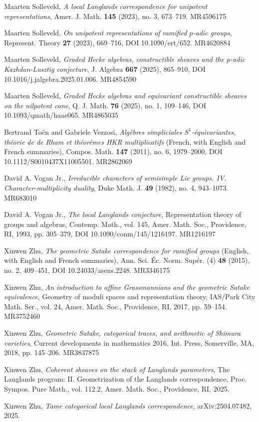 \begin{refs}
\item[{[Sol18]}] Maarten Solleveld, \emph{A local Langlands correspondence for unipotent representations}, Amer. J. Math. \textbf{145} (2023), no. 3, 673--719. MR4596175
\item[{[Sol19]}] Maarten Solleveld, \emph{On unipotent representations of ramified $p$-adic groups}, Represent. Theory \textbf{27} (2023), 669--716, DOI 10.1090/ert/652. MR4620884
\item[{[Sol22a]}] Maarten Solleveld, \emph{Graded Hecke algebras, constructible sheaves and the $p$-adic Kazhdan-Lusztig conjecture}, J. Algebra \textbf{667} (2025), 865--910, DOI 10.1016/j.jalgebra.2025.01.006. MR4854590
\item[{[Sol22b]}] Maarten Solleveld, \emph{Graded Hecke algebras and equivariant constructible sheaves on the nilpotent cone}, Q. J. Math. \textbf{76} (2025), no. 1, 109--146, DOI 10.1093/qmath/haae065. MR4865035
\item[{[TV]}] Bertrand To\"en and Gabriele Vezzosi, \emph{Alg\`ebres simpliciales $S^1$-\'equivariantes, th\'eorie de de Rham et th\'eor\`emes HKR multiplicatifs} (French, with English and French summaries), Compos. Math. \textbf{147} (2011), no. 6, 1979--2000, DOI 10.1112/S0010437X11005501. MR2862069
\item[{[Vo82]}] David A. Vogan Jr., \emph{Irreducible characters of semisimple Lie groups. IV. Character-multiplicity duality}, Duke Math. J. \textbf{49} (1982), no. 4, 943--1073. MR683010
\item[{[Vo93]}] David A. Vogan Jr., \emph{The local Langlands conjecture}, Representation theory of groups and algebras, Contemp. Math., vol. 145, Amer. Math. Soc., Providence, RI, 1993, pp. 305--379, DOI 10.1090/conm/145/1216197. MR1216197
\item[{[Zh15]}] Xinwen Zhu, \emph{The geometric Satake correspondence for ramified groups} (English, with English and French summaries), Ann. Sci. \'Ec. Norm. Sup\'er. (4) \textbf{48} (2015), no. 2, 409--451, DOI 10.24033/asens.2248. MR3346175
\item[{[Zh17]}] Xinwen Zhu, \emph{An introduction to affine Grassmannians and the geometric Satake equivalence}, Geometry of moduli spaces and representation theory, IAS/Park City Math. Ser., vol. 24, Amer. Math. Soc., Providence, RI, 2017, pp. 59--154. MR3752460
\item[{[Zh18]}] Xinwen Zhu, \emph{Geometric Satake, categorical traces, and arithmetic of Shimura varieties}, Current developments in mathematics 2016, Int. Press, Somerville, MA, 2018, pp. 145--206. MR3837875


\item[{[Zhu25a]}] Xinwen Zhu, \emph{Coherent sheaves on the stack of Langlands parameters}, The Langlands program: II. Geometrization of the Langlands correspondence, Proc. Sympos. Pure Math., vol. 112.2, Amer. Math. Soc., Providence, RI, 2025.
\item[{[Zhu25b]}] Xinwen Zhu, \emph{Tame categorical local Langlands correspondence}, arXiv:2504.07482, 2025.
\end{refs}

